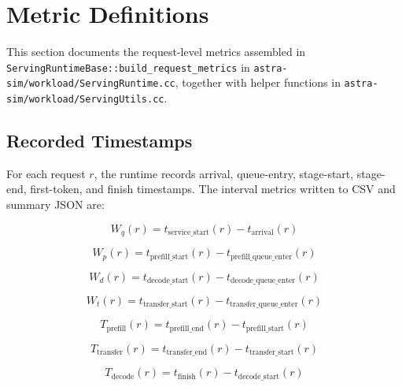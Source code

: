 \section{Metric Definitions}

This section documents the request-level metrics assembled in
\texttt{ServingRuntimeBase::build\_request\_metrics} in
\texttt{astra-sim/workload/ServingRuntime.cc}, together with helper functions in
\texttt{astra-sim/workload/ServingUtils.cc}.

\subsection{Recorded Timestamps}

For each request \(r\), the runtime records arrival, queue-entry, stage-start,
stage-end, first-token, and finish timestamps. The interval metrics written to
CSV and summary JSON are:

\begin{equation*}
W_q(r) = t_{\mathrm{service\_start}}(r) - t_{\mathrm{arrival}}(r)
\end{equation*}

\begin{equation*}
W_p(r) = t_{\mathrm{prefill\_start}}(r) - t_{\mathrm{prefill\_queue\_enter}}(r)
\end{equation*}

\begin{equation*}
W_d(r) = t_{\mathrm{decode\_start}}(r) - t_{\mathrm{decode\_queue\_enter}}(r)
\end{equation*}

\begin{equation*}
W_t(r) = t_{\mathrm{transfer\_start}}(r) - t_{\mathrm{transfer\_queue\_enter}}(r)
\end{equation*}

\begin{equation*}
T_{\mathrm{prefill}}(r) = t_{\mathrm{prefill\_end}}(r) - t_{\mathrm{prefill\_start}}(r)
\end{equation*}

\begin{equation*}
T_{\mathrm{transfer}}(r) = t_{\mathrm{transfer\_end}}(r) - t_{\mathrm{transfer\_start}}(r)
\end{equation*}

\begin{equation*}
T_{\mathrm{decode}}(r) = t_{\mathrm{finish}}(r) - t_{\mathrm{decode\_start}}(r)
\end{equation*}


